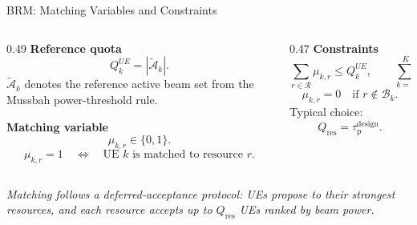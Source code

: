 \documentclass[10pt,aspectratio=169]{beamer}
\newcommand{\taudesign}{\tau_{\mathrm{p}}^{\mathrm{design}}}
\newcommand{\callout}[1]{%
    \vspace{0.3em}
    {\footnotesize\itshape #1}
}
\begin{document}
\begin{frame}{BRM: Matching Variables and Constraints}
    \small
    \begin{columns}[T,onlytextwidth]
        \begin{column}{0.49\textwidth}
            \textbf{Reference quota}
            \[
                Q_k^{UE}=|\widetilde{\mathcal{A}}_k|.
            \]
            \(\widetilde{\mathcal{A}}_k\) denotes the reference active beam set from the Mussbah power-threshold rule.

            \vspace{0.4em}
            \textbf{Matching variable}
            \[
                \mu_{k,r}\in\{0,1\}.
            \]
            \[
                \mu_{k,r}=1
                \quad \Longleftrightarrow \quad
                \text{UE }k\text{ is matched to resource }r.
            \]
        \end{column}
        \begin{column}{0.47\textwidth}
            \textbf{Constraints}
            \[
                \sum_{r\in\mathcal{R}}\mu_{k,r}
                \le Q_k^{UE},
                \qquad
                \sum_{k=1}^{K}\mu_{k,r}
                \le Q_{\mathrm{res}}.
            \]
            \[
                \mu_{k,r}=0
                \quad
                \text{if } r\notin \mathcal{B}_k.
            \]
            Typical choice:
            \[
                Q_{\mathrm{res}}=\taudesign.
            \]
        \end{column}
    \end{columns}

    \vspace{0.35em}
    \callout{Matching follows a deferred-acceptance protocol: UEs propose to their strongest resources, and each resource accepts up to \(Q_{\mathrm{res}}\) UEs ranked by beam power.}
\end{frame}
\end{document}
